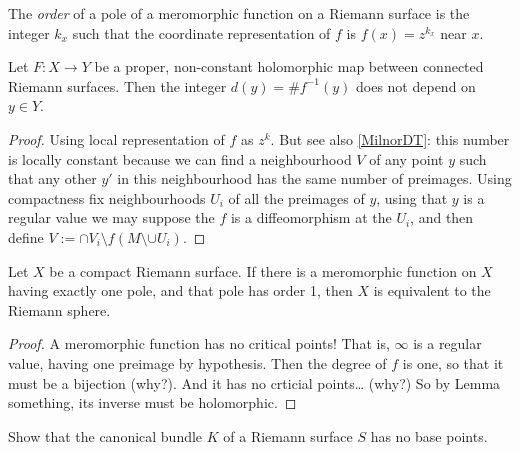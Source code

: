 \begin{definition}
\label{definition-pole-of-meromorphic-function-on-Riemann-surface}
\begin{reference}
\cite[p. 45]{Donaldson}
\end{reference}
The {\it order} of a pole of a meromorphic function on a Riemann surface is the
integer $k_x$ such that the coordinate representation of $f$ is $f(x)=z^{k_x}$
near $x$.
\end{definition}

\begin{proposition}
\label{proposition-degree-is-constant}
\begin{reference}
\cite[p. 46]{Donaldson}
\end{reference}
Let $F:X\to Y$ be a proper, non-constant holomorphic map between connected
Riemann surfaces. Then the integer $d(y)=\# f^{-1}(y)$ does not depend on $y \in
Y$.
\end{proposition}

\begin{proof}
Using local representation of $f$ as $z^k$. But see also \ref{MilnorDT}: this
number is locally constant because we can find a neighbourhood $V$ of any point 
$y$ such that any other $y'$ in this neighbourhood has the same number of
preimages. Using compactness fix neighbourhoods $U_i$ of all the preimages of 
$y$, using that $y$ is a regular value we may suppose the $f$ is a
diffeomorphism at the $U_i$, and then define 
$V:=\cap V_i\setminus f(M\setminus\cup U_i)$.
\end{proof}

\begin{lemma}
\label{lemma-meromorphic-function-with-one-pole-of-order-1-gives-Riemann-sphere}
Let $X$ be a compact Riemann surface. If there is a meromorphic function on $X$
having exactly one pole, and that pole has order 1, then $X$ is equivalent to
the Riemann sphere.
\end{lemma}

\begin{proof}
A meromorphic function has no critical points! That is, $\infty$ is a regular
value, having one preimage by hypothesis. Then the degree of $f$ is one, so that
it must be a bijection (why?). And it has no crticial points… (why?) So by Lemma
something, its inverse must be holomorphic.
\end{proof}

\begin{exercise}
\label{exercise-canonical-bundle-of-Riemann-surface-has-no-base-points}
Show that the canonical bundle $K$ of a Riemann surface $S$ has no base points.
\end{exercise}

